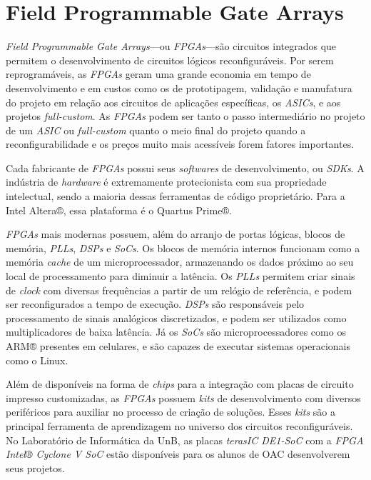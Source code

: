 \section{Field Programmable Gate Arrays}
{
    \textit{Field Programmable Gate Arrays}---ou \textit{FPGAs}---são circuitos
    integrados que permitem o desenvolvimento de circuitos lógicos
    reconfiguráveis. Por serem reprogramáveis, as \textit{FPGAs} geram uma
    grande economia em tempo de desenvolvimento e em custos como os de
    prototipagem, validação e manufatura do projeto em relação aos circuitos de
    aplicações específicas, os \textit{ASICs}, e aos projetos
    \textit{full-custom}. As \textit{FPGAs} podem ser tanto o passo
    intermediário no projeto de um \textit{ASIC} ou \textit{full-custom} quanto
    o meio final do projeto quando a reconfigurabilidade e os preços muito mais
    acessíveis forem fatores importantes.

    Cada fabricante de \textit{FPGAs} possui seus \textit{softwares} de
    desenvolvimento, ou \textit{SDKs}. A indústria de \textit{hardware} é
    extremamente protecionista com sua propriedade intelectual, sendo a maioria
    dessas ferramentas de código proprietário. Para a Intel Altera®, essa
    plataforma é o Quartus Prime®.

    \textit{FPGAs} mais modernas possuem, além do arranjo de portas lógicas,
    blocos de memória, \textit{PLLs}, \textit{DSPs} e \textit{SoCs}. Os blocos
    de memória internos funcionam como a memória \textit{cache} de um
    microprocessador, armazenando os dados próximo ao seu local de
    processamento para diminuir a latência. Os \textit{PLLs} permitem criar
    sinais de \textit{clock} com diversas frequências a partir de um relógio de
    referência, e podem ser reconfigurados a tempo de execução. \textit{DSPs}
    são responsáveis pelo processamento de sinais analógicos discretizados, e
    podem ser utilizados como multiplicadores de baixa latência. Já os
    \textit{SoCs} são microprocessadores como os ARM® presentes
    em celulares, e são capazes de executar sistemas operacionais como o Linux.

    Além de disponíveis na forma de \textit{chips} para a integração com placas
    de circuito impresso customizadas, as \textit{FPGAs} possuem \textit{kits}
    de desenvolvimento com diversos periféricos para auxiliar no processo de
    criação de soluções. Esses \textit{kits} são a principal ferramenta de
    aprendizagem no universo dos circuitos reconfiguráveis. No Laboratório de
    Informática da UnB, as placas \textit{terasIC DE1-SoC} com a \textit{FPGA
    Intel® Cyclone V SoC} estão disponíveis para os alunos de OAC desenvolverem
    seus projetos.
}

